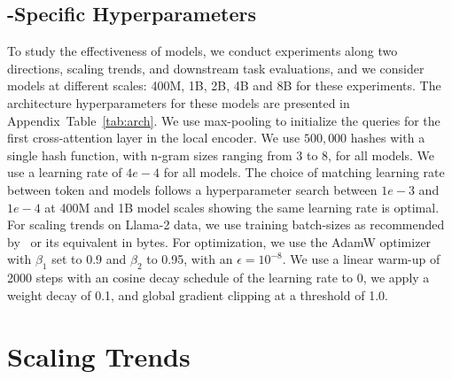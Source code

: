 \documentclass[]{fairmeta}
\begin{document}
\subsection{\model{}-Specific Hyperparameters} To study the effectiveness of \model{} models, we conduct experiments along two directions, scaling trends, and downstream task evaluations, and we consider models at different scales: 400M, 1B, 2B, 4B and 8B for these experiments. The architecture hyperparameters for these models are presented in Appendix~Table~\ref{tab:arch}. 
We use max-pooling to initialize the queries for the first cross-attention layer in the local encoder. We use $500,000$ hashes with a single hash function, with n-gram sizes ranging from 3 to 8, for all  \model{} models. We use a learning rate of $4e-4$ for all models. The choice of matching learning rate between token and \model{} models follows a hyperparameter search between $1e-3$ and $1e-4$ at 400M and 1B model scales showing the same learning rate is optimal.
For scaling trends on Llama-2 data, we use training batch-sizes as recommended by~\cite{dubey2024llama} or its equivalent in bytes. For optimization, we use the AdamW optimizer~\citep{adamw} with $\beta_1$ set to 0.9 and $\beta_2$ to 0.95, with an $\epsilon=10^{-8}$. We use a linear warm-up of 2000 steps with an cosine decay schedule of the learning rate to 0, we apply a weight decay of 0.1, and global gradient clipping at a threshold of 1.0. 

\section{Scaling Trends}
\label{section:scaling}
\end{document}
